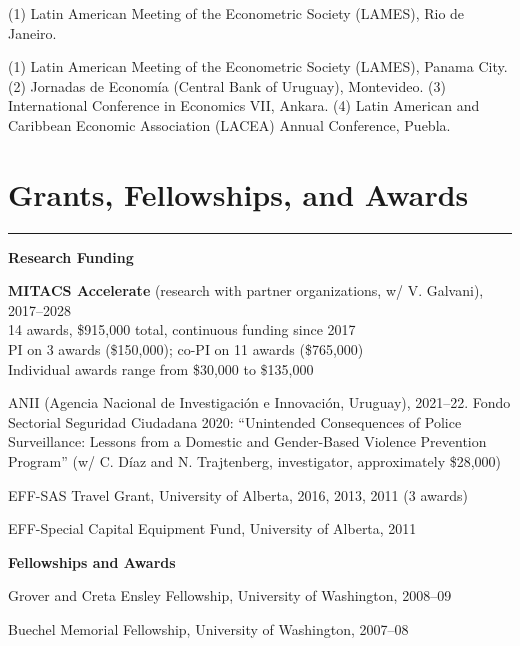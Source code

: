 \documentclass[overlapped,letterpaper,11pt]{res}
\newcommand{\cvrule}{%
  \hspace*{-\sectionwidth}%
  \rule[2mm]{\dimexpr\textwidth+\sectionwidth\relax}{.25pt}}
\newcommand{\cvsection}[1]{%
  \needspace{4\baselineskip}%
  \section{\textbf{#1}}%
  \cvrule}
\newenvironment{list1}{
  \begin{list}{\textendash}{%
      \setlength{\itemsep}{0in}
      \setlength{\parsep}{0in} \setlength{\parskip}{0in}
      \setlength{\topsep}{0in} \setlength{\partopsep}{0in}
      \setlength{\leftmargin}{0.17in}}}{\end{list}
}
\begin{document}
\begin{resume}
\begin{mylist}
	\item [2008]
	(1) Latin American Meeting of the Econometric Society (LAMES), Rio de Janeiro.

	\item [2003]
	(1) Latin American Meeting of the Econometric Society (LAMES), Panama City.
	(2) Jornadas de Econom\'ia (Central Bank of Uruguay), Montevideo.
	(3) International Conference in Economics VII, Ankara.
	(4) Latin American and Caribbean Economic Association (LACEA) Annual Conference, Puebla.

\end{mylist}


\cvsection{Grants, Fellowships, and Awards} %
\begin{itemize}

\item \textbf{Research Funding}
	\begin{list1}
	\item[-] \textbf{MITACS Accelerate} (research with partner organizations, w/ V. Galvani), 2017--2028 \\
	14 awards, \$915,000 total, continuous funding since 2017 \\
	PI on 3 awards (\$150,000); co-PI on 11 awards (\$765,000) \\
	Individual awards range from \$30,000 to \$135,000
	\vspace*{.04in}

	\item[-] ANII (Agencia Nacional de Investigaci\'on e Innovaci\'on, Uruguay), 2021--22.
	Fondo Sectorial Seguridad Ciudadana 2020: ``Unintended Consequences of Police
	Surveillance: Lessons from a Domestic and Gender-Based Violence Prevention Program''
	(w/ C. D\'iaz and N. Trajtenberg, investigator, approximately \$28,000)
	\item[-] EFF-SAS Travel Grant, University of Alberta, 2016, 2013, 2011 (3 awards)
	\item[-] EFF-Special Capital Equipment Fund, University of Alberta, 2011 %
	\end{list1}

\item \textbf{Fellowships and Awards}
	\begin{list1}
	\item[-] Grover and Creta Ensley Fellowship, University of Washington, 2008--09
	\item[-] Buechel Memorial Fellowship, University of Washington, 2007--08
	\end{list1}


\end{itemize}
\end{resume}
\end{document}
